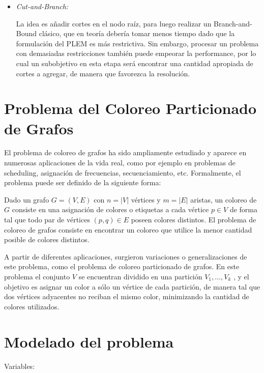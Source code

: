 \documentclass[a4paper]{article}
\begin{document}
\begin{itemize}
\begin{itemize}
		\item {\it Cut-and-Branch:}
		
		La idea es añadir cortes en el nodo raíz, para luego realizar un Branch-and-Bound clásico, que en teoría debería tomar menos tiempo dado que la formulación del PLEM es más restrictiva. Sin embargo, procesar un problema con demasiadas restricciones también puede empeorar la performance, por lo cual un subobjetivo en esta etapa será encontrar una cantidad apropiada de cortes a agregar, de manera que favorezca la resolución.
	
	\end{itemize}
	
	
\end{itemize}

\newpage

\section{Problema del Coloreo Particionado de Grafos}

El problema de coloreo de grafos ha sido ampliamente estudiado y aparece en numerosas aplicaciones de la vida real, como por ejemplo en problemas de scheduling, asignación de frecuencias, secuenciamiento, etc. Formalmente, el problema puede ser definido de la siguiente forma: 

Dado un grafo $G = (V,E)$ con $n = |V|$ vértices y $m = |E|$ aristas, un coloreo de $G$ consiste en una asignación de colores o etiquetas a cada vértice $p\in V$ de forma tal que todo par de vértices $(p, q) \in E$ poseen colores distintos. El problema de coloreo de grafos consiste en encontrar un coloreo que utilice la menor cantidad posible de colores distintos.

A partir de diferentes aplicaciones, surgieron variaciones o generalizaciones de este problema, como el problema de coloreo particionado de grafos. En este problema el conjunto $V$ se encuentran dividido en una partición $V_1 , . . . , V_k$ , y el objetivo es asignar un color a sólo un vértice de cada partición, de manera tal que dos vértices adyacentes no reciban el mismo color, minimizando la cantidad de colores utilizados.

\newpage

\section{Modelado del problema}


Variables:
\end{document}
